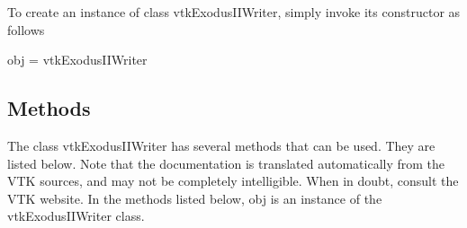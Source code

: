 To create an instance of class vtk\-Exodus\-I\-I\-Writer, simply invoke its constructor as follows \begin{DoxyVerb}  obj = vtkExodusIIWriter
\end{DoxyVerb}
 \hypertarget{vtkwidgets_vtkxyplotwidget_Methods}{}\subsection{Methods}\label{vtkwidgets_vtkxyplotwidget_Methods}
The class vtk\-Exodus\-I\-I\-Writer has several methods that can be used. They are listed below. Note that the documentation is translated automatically from the V\-T\-K sources, and may not be completely intelligible. When in doubt, consult the V\-T\-K website. In the methods listed below, {\ttfamily obj} is an instance of the vtk\-Exodus\-I\-I\-Writer class. 
